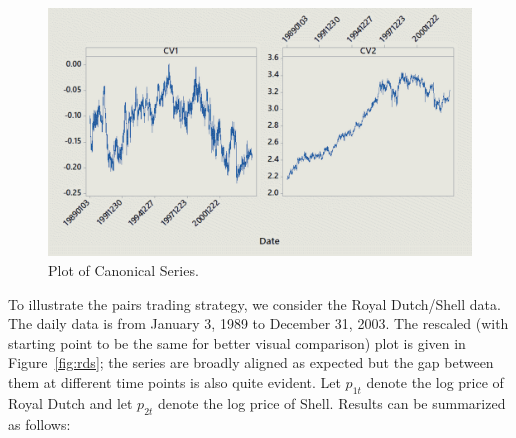 	\begin{figure}[!ht]
	\centering
	\includegraphics[width=\textwidth]{chapters/chapter_stat_ts/figures/can.png}
	\caption{Plot of Canonical Series. \label{fig:can}}
	\end{figure}


To illustrate the pairs trading strategy, we consider the Royal Dutch/Shell data. The daily data is from January 3, 1989 to December 31, 2003. The rescaled (with starting point to be the same for better visual comparison) plot is given in Figure~\ref{fig:rds}; the series are broadly aligned as expected but the gap between them at different time points is also quite evident. Let $p_{1t}$ denote the log price of Royal Dutch and let $p_{2t}$ denote the log price of Shell. Results can be summarized as follows:

